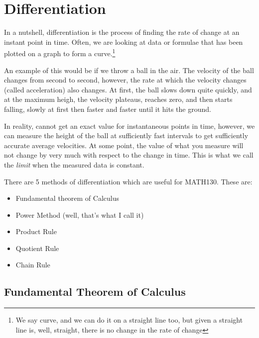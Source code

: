 \chapter{Differentiation}
\label{chap:Differentiation}
In a nutshell, differentiation is the process of finding the rate of change at
an instant point in time. Often, we are looking at data or formulae that has
been plotted on a graph to form a curve.\footnote{We say curve, and we can do it
on a straight line too, but given a straight line is, well, straight, there is
no change in the rate of change}

An example of this would be if we throw a ball in the air. The velocity of the
ball changes from second to second, however, the rate at which the velocity
changes (called acceleration) also changes. At first, the ball slows down quite
quickly, and at the maximum heigh, the velocity plateaus, reaches zero, and then
starts falling, slowly at first then faster and faster until it hits the ground.

In reality, cannot get an exact value for instantaneous points in time, however,
we can measure the height of the ball at sufficiently fast intervals to
get sufficiently accurate average velocities. At some point, the value of what
you measure will not change by very much with respect to the change in time.
This is what we call the \emph{limit} when the measured data is constant.

There are 5 methods of differentiation which are useful for MATH130. These are:
\begin{itemize}
  \item Fundamental theorem of Calculus
  \item Power Method (well, that's what I call it)
  \item Product Rule
  \item Quotient Rule
  \item Chain Rule
\end{itemize}

\section{Fundamental Theorem of Calculus}
\label{sec:FundamentalTheoremOfCalculus}

